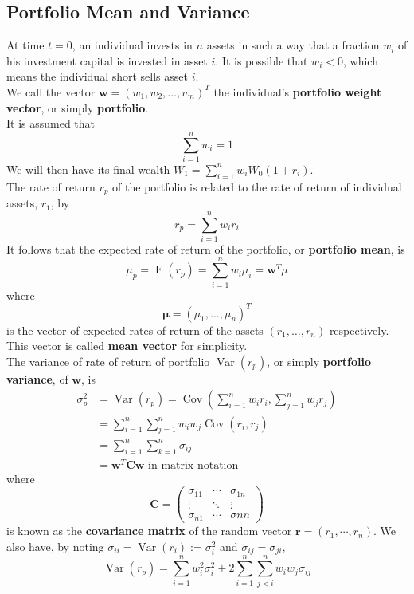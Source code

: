 \documentclass[12pt]{article}
\theoremstyle{definition}
\DeclareMathOperator{\expec}{E}
\DeclareMathOperator{\var}{Var}
\DeclareMathOperator{\cov}{Cov}
\begin{document}
\subsection{Portfolio Mean and Variance}
At time $t=0$, an individual invests in $n$ assets in such a way that a fraction $w_i$ of his investment capital is invested in asset $i$. It is possible that $w_i<0$, which means the individual short sells asset $i$. \\We call the vector $\mathbf{w} = (w_1,w_2,\ldots, w_n)^T$ the individual's \textbf{portfolio weight vector}, or simply \textbf{portfolio}. \\It is assumed that
\[
\sum_{i=1}^n w_i = 1
\] 
We will then have its final wealth $W_1 = \sum_{i=1}^n w_iW_0(1+r_i)$.\\
The rate of return $r_p$ of the portfolio is related to the rate of return of individual assets, $r_1$, by
\[
r_p = \sum_{i=1}^n w_ir_i
\]
It follows that the expected rate of return of the portfolio, or \textbf{portfolio mean}, is
\[
\mu_p = \expec(r_p) = \sum_{i=1}^n w_i\mu_i = \mathbf{w}^T\mu
\]
where 
\[
\mathbf{\mu} = (\mu_1,\ldots, \mu_n)^T
\]
is the vector of expected rates of return of the assets $(r_1,\ldots, r_n)$ respectively. This vector is called \textbf{mean vector} for simplicity.\\
The variance of rate of return of portfolio $\var(r_p)$, or simply \textbf{portfolio variance}, of $\mathbf{w}$, is
\begin{align*}
\sigma_p^2 &= \var(r_p) = \cov(\sum_{i=1}^n w_ir_i,\sum_{j=1}^n w_jr_j )\\
&=\sum_{i=1}^n\sum_{j=1}^n w_iw_j\cov(r_i,r_j)\\
&=\sum_{i=1}^n\sum_{k=1}^n \sigma_{ij}\\
&=\mathbf{w}^T\mathbf{C}\mathbf{w}\text{ in matrix notation}
\end{align*}
where
\[
\mathbf{C} = \begin{pmatrix}
\sigma_{11}&\cdots&\sigma_{1n}\\
\vdots&\ddots&\vdots\\
\sigma_{n1}&\cdots&\sigma{nn}\end{pmatrix}
\]
is known as the \textbf{covariance matrix} of the random vector $\mathbf{r} = (r_1,\cdots, r_n)$.
We also have, by noting $\sigma_{ii} = \var(r_i) := \sigma_i^2$ and $\sigma_{ij} = \sigma_{ji}$,
\[
\var(r_p) = \sum_{i=1}^n w_i^2 \sigma_i^2 + 2\sum_{i=1}^n\sum_{j<i}^n w_iw_j\sigma_{ij}
\]
\end{document}
